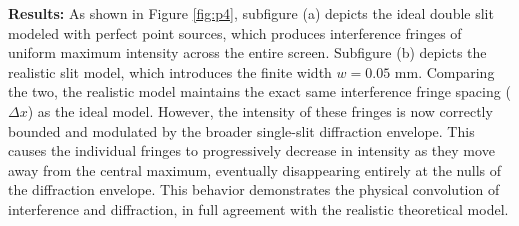 \documentclass{article}
\begin{document}
\textbf{Results:} As shown in Figure \ref{fig:p4}, subfigure (a) depicts the ideal double slit modeled with perfect point sources, which produces interference fringes of uniform maximum intensity across the entire screen. Subfigure (b) depicts the realistic slit model, which introduces the finite width $w=0.05$ mm. Comparing the two, the realistic model maintains the exact same interference fringe spacing ($\Delta x$) as the ideal model. However, the intensity of these fringes is now correctly bounded and modulated by the broader single-slit diffraction envelope. This causes the individual fringes to progressively decrease in intensity as they move away from the central maximum, eventually disappearing entirely at the nulls of the diffraction envelope. This behavior demonstrates the physical convolution of interference and diffraction, in full agreement with the realistic theoretical model.
\end{document}
